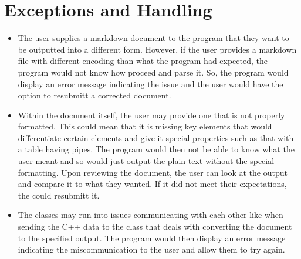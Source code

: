 \section{Exceptions and Handling}
\begin{itemize}
\item The user supplies a markdown document to the program that they want to be outputted into a different form. However, if the user provides a markdown file with different encoding than what the program had expected, the program would not know how proceed and parse it. So, the program would display an error message indicating the issue and the user would have the option to resubmitt a corrected document.  
\item Within the document itself, the user may provide one that is not properly formatted. This could mean that it is missing key elements that would differentiate certain elements and give it special properties such as that with a table having pipes. The program would then not be able to know what the user meant and so would just output the plain text without the special formatting. Upon reviewing the document, the user can look at the output and compare it to what they wanted. If it did not meet their expectations, the could resubmitt it. 
\item The classes may run into issues communicating with each other like when sending the C++ data to the class that deals with converting the document to the specified output. The program would then display an error message indicating the miscommunication to the user and allow them to try again.  
\end{itemize}
